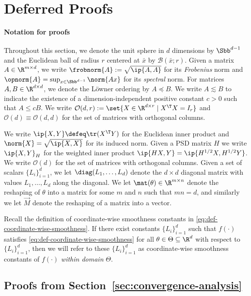\section{Deferred Proofs}\label{sec:deferred-proofs}

\paragraph{Notation for proofs} Throughout this section, we denote the unit sphere in $d$ dimensions by $\Sbb^{d-1}$ and the Euclidean ball of radius $r$ centered at $\bar{x}$ by $\mathcal{B}(\bar{x}; r)$. Given a matrix $A \in \R^{m \times d}$, we write $\frobnorm{A} := \sqrt{\ip{A, A}}$ for its \emph{Frobenius} norm and $\opnorm{A} = \sup_{x \in \Sbb^{d-1}} \norm{Ax}$ for its \emph{spectral} norm. For matrices $A, B \in \R^{d\times d}$, we denote the L\"owner ordering by $A\preceq B$. We write $A \lesssim B$ to indicate the existence of a dimension-independent positive constant $c > 0$ such that $A \leq cB$.  We write $\mathcal{O}(d, r) := \set{X \in \R^{d \times r} \mid X^{\T} X = I_{r}}$ and $\mathcal{O}(d) \equiv \mathcal{O}(d, d)$ for the set of matrices with orthogonal columns.

We write $\ip{X, Y} \defeq \tr(X^{\T} Y)$ for the Euclidean inner product and $\norm{X} = \sqrt{\ip{X, X}}$ for its induced norm. Given a PSD matrix $H$ we write $\ip{X, Y}_{H}$ for the weighted inner product $\ip{HX, Y} = \ip{H^{1/2} X, H^{1/2} Y}$.  We write $\mathcal{O}(d)$ for the set of matrices with orthogonal columns. Given a set of scalars $\{L_i\}_{i=1}^d$, we let $\diag(L_1,\dots,L_d)$ denote the $d\times d$ diagonal matrix with values $L_1,\dots, L_d$ along the diagonal.  We let $\mat(\theta)\in \R^{m\times n}$ denote the reshaping of $\theta$ into a matrix for some $m$ and $n$ such that $m n = d$, and similarly we let $\vec{M}$ denote the reshaping of a matrix into a vector. 

Recall the definition of coordinate-wise smoothness constants in \cref{eq:def-coordinate-wise-smoothness}. If there exist constants $\{L_i\}_{i=1}^d$ such that $f(\cdot)$ satisfies \cref{eq:def-coordinate-wise-smoothness} for all $\theta \in \Theta\subseteq \R^d$ with respect to $\{L_i\}_{i=1}^d$, then we will refer to these $\{L_i\}_{i=1}^d$ as coordinate-wise smoothness constants of $f(\cdot)$ \textit{within domain } $\Theta$.

\subsection{Proofs from Section~\ref{sec:convergence-analysis}}

